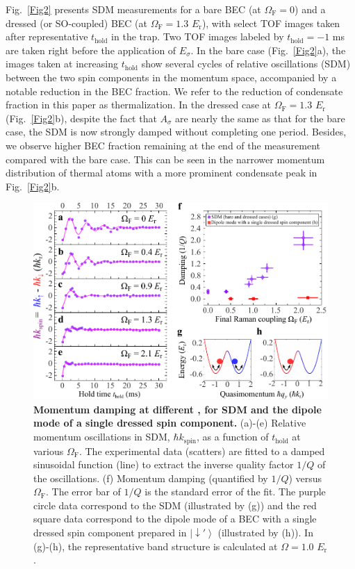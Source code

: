\documentclass[showpacs,preprintnumbers,amsmath,amssymb, superscriptaddress, aps, reprint]{revtex4-1}
\def\E_r{E_{\text{r}}}
\def\OmegaF{\Omega_{\text{F}}}
\def\thold{t_{\text{hold}}}
\begin{document}
{Fig.~\ref{Fig2} presents SDM measurements for a bare BEC (at $\OmegaF=0$) and a dressed (or SO-coupled) BEC (at $\OmegaF = 1.3$ $\E_r$), with select TOF images taken after representative $\thold$ in the trap. Two TOF images labeled by $\thold= -1$ ms are taken right before the application of $E_{\sigma}$. 
In the bare case (Fig.~\ref{Fig2}a), the images taken at increasing $\thold$ show several cycles of relative oscillations (SDM) between the two spin components in the momentum space, accompanied by a notable reduction in the BEC fraction. 
{We refer to the reduction of condensate fraction in this paper as thermalization}. 
In the dressed case at $\OmegaF = 1.3$ $\E_r$ (Fig.~\ref{Fig2}b), despite the fact that $A_{\sigma}$ are nearly the same as that for the bare case, the SDM is now strongly damped without completing one period. Besides, we observe higher BEC fraction remaining at the end of the measurement compared with the bare case. This can be seen in the narrower momentum distribution of thermal atoms with a more prominent condensate peak in Fig.~\ref{Fig2}b. 
\begin{figure}[t]
\centering
\includegraphics[width=6.0in]{Fig3_V20_2DTFG_Vfinal.pdf}
\caption{\textbf{Momentum damping at different \boldmath{$\OmegaF$}, for SDM and the dipole mode of a single dressed spin component.} (a)-(e) Relative momentum oscillations in SDM, $\hbar k_{\text{spin}}$, as a function of $\thold$ at various $\OmegaF$. The experimental data (scatters) are fitted to a damped sinusoidal function (line) to extract the inverse quality factor $1/Q$ of the oscillations. (f) Momentum damping (quantified by $1/Q$) versus $\OmegaF$. The error bar of $1/Q$ is the standard error of the fit. The purple circle data correspond to the SDM (illustrated by (g)) and the red square data correspond to the dipole mode of a BEC with a single dressed spin component prepared in $\left| { \downarrow '} \right\rangle$ (illustrated by (h)). In (g)-(h), the representative band structure is calculated at $\Omega=1.0$ $\E_r$.}

\end{figure}}
\end{document}

